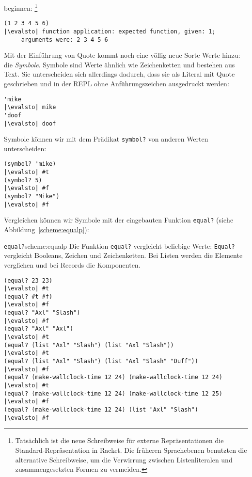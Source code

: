 beginnen: \footnote{Tatsächlich ist die neue Schreibweise für externe
  Repräsentationen die Standard-Repräsentation in Racket.  Die
  früheren Sprachebenen benutzten die alternative Schreibweise, um die
  Verwirrung zwischen Listenliteralen und zusammengesetzten Formen zu
  vermeiden.}
\begin{lstlisting}
(1 2 3 4 5 6)
|\evalsto| function application: expected function, given: 1;
     arguments were: 2 3 4 5 6
\end{lstlisting}
%
Mit der Einführung von Quote kommt noch eine völlig neue Sorte Werte
hinzu: die \textit{Symbole}.  Symbole sind Werte ähnlich wie Zeichenketten und
bestehen aus Text.  Sie unterscheiden sich allerdings dadurch, dass sie
als Literal mit Quote geschrieben und in der REPL ohne
Anführungszeichen ausgedruckt werden:
%
\begin{lstlisting}
'mike
|\evalsto| mike
'doof
|\evalsto| doof
\end{lstlisting}
%
Symbole können wir mit dem Prädikat
\lstinline{symbol?} von anderen Werten
unterscheiden:
%
\begin{lstlisting}
(symbol? 'mike)
|\evalsto| #t
(symbol? 5)
|\evalsto| #f
(symbol? "Mike")
|\evalsto| #f
\end{lstlisting}
%
Vergleichen können wir Symbole mit der eingebauten Funktion \lstinline{equal?} (siehe
Abbildung~\ref{scheme:equalp}):
\begin{feature}{\texttt{equal?}}{scheme:equalp}
  Die Funktion \texttt{equal?} vergleicht beliebige Werte:
  \texttt{Equal?} vergleicht Booleans, Zeichen und Zeichenketten.
  Bei Listen werden die Elemente verglichen und bei Records die Komponenten. 
%
\begin{lstlisting}
(equal? 23 23)
|\evalsto| #t
(equal? #t #f)
|\evalsto| #f
(equal? "Axl" "Slash")
|\evalsto| #f
(equal? "Axl" "Axl")
|\evalsto| #t
(equal? (list "Axl" "Slash") (list "Axl "Slash"))
|\evalsto| #t
(equal? (list "Axl" "Slash") (list "Axl "Slash" "Duff"))
|\evalsto| #f
(equal? (make-wallclock-time 12 24) (make-wallclock-time 12 24)
|\evalsto| #t
(equal? (make-wallclock-time 12 24) (make-wallclock-time 12 25)
|\evalsto| #f
(equal? (make-wallclock-time 12 24) (list "Axl" "Slash")
|\evalsto| #f
\end{lstlisting}
\end{feature}

